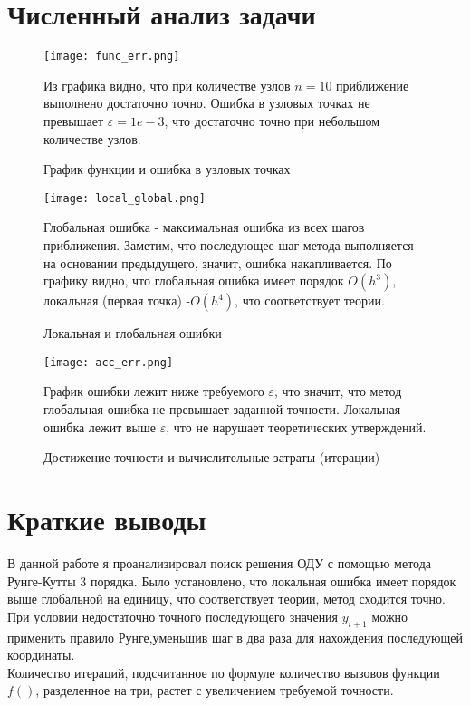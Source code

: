 \documentclass[12pt]{article}
\begin{document}
\section{Численный анализ задачи}
\begin{figure}[h!]
\center
\texttt{[image: func\_err.png]}
\caption{График функции и ошибка в узловых точках}
Из графика видно, что при количестве узлов $n = 10$ приближение выполнено достаточно точно. Ошибка в узловых точках не превышает $\varepsilon = 1e-3$, что достаточно точно при небольшом количестве узлов.
\end{figure}
\begin{figure}[h!]
\center
\texttt{[image: local\_global.png]}
\caption{Локальная и глобальная ошибки}
Глобальная ошибка - максимальная ошибка из всех шагов приближения. Заметим, что последующее шаг метода выполняется на основании предыдущего, значит, ошибка накапливается. По графику видно, что глобальная ошибка имеет порядок $O(h^3)$, локальная (первая точка) -$O(h^4)$, что соответствует теории. \\
\end{figure}
\begin{figure}[h!]
\center
\texttt{[image: acc\_err.png]}
\caption{Достижение точности и вычислительные затраты (итерации)}
График ошибки лежит ниже требуемого $\varepsilon$, что значит, что метод глобальная ошибка не превышает заданной точности. Локальная ошибка лежит выше $\varepsilon$, что не нарушает теоретических утверждений.
\end{figure}

\newpage
\newpage
\section{Краткие выводы}
В данной работе я проанализировал поиск решения ОДУ с помощью метода Рунге-Кутты 3 порядка. Было установлено, что локальная ошибка имеет порядок выше глобальной на единицу, что соответствует теории, метод сходится точно.\\
При условии недостаточно точного последующего значения $y_{i+1}$ можно применить правило Рунге,уменьшив шаг в два раза для нахождения последующей координаты.\\
Количество итераций, подсчитанное по формуле количество вызовов функции $f()$, разделенное на три, растет с увеличением требуемой точности.
\end{document}
